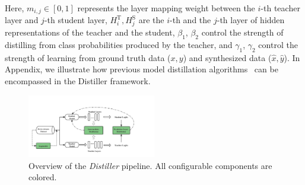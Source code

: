 \documentclass[11pt]{article}
\begin{document}
Here, $m_{i, j} \in [0, 1]$ represents the layer mapping weight between the $i$-th teacher layer and $j$-th student layer, $H_i^\text{T}, H_j^\text{S}$ are the $i$-th and the $j$-th layer of hidden representations of the teacher and the student, $\beta_1$, $\beta_2$ control the strength of distilling from class probabilities produced by the teacher, and $\gamma_1$, $\gamma_2$ control the strength of learning from ground truth data ($x,y$) and synthesized data ($\hat{x},\hat{y}$). In Appendix, we illustrate how previous model distillation algorithms~\citep{jiao2019tinybert, li2020bert, liang2020mixkd} can be encompassed in the Distiller framework.
\begin{figure}[tb!]
  \centering
  \includegraphics[width=0.5\textwidth]{pics/Distiller.png}
  \vspace{-1em}
  \caption{Overview of the \emph{Distiller} pipeline. All configurable components are colored.}
  \vspace{-1em}
\end{figure}
\end{document}
